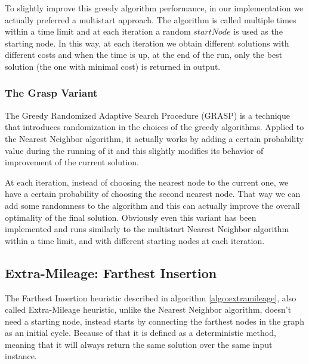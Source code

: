 To slightly improve this greedy algorithm performance, in our implementation we actually preferred a multistart approach. The algorithm is called multiple times within a time limit and at each iteration a random $startNode$ is used as the starting node. In this way, at each iteration we obtain different solutions with different costs and when the time is up, at the end of the run, only the best solution (the one with minimal cost) is returned in output.

\subsubsection{The Grasp Variant}
The Greedy Randomized Adaptive Search Procedure (GRASP) is a technique that introduces randomization in the choices of the greedy algorithms.
Applied to the Nearest Neighbor algorithm, it actually works by adding a certain probability value during the running of it and this slightly modifies its behavior of improvement of the current solution.

At each iteration, instead of choosing the nearest node to the current one, we have a certain probability of choosing the second nearest node. That way we can add some randomness to the algorithm and this can actually improve the overall optimality of the final solution.
Obviously even this variant has been implemented and runs similarly to the multistart Nearest Neighbor algorithm within a time limit, and with different starting nodes at each iteration.

\subsection{Extra-Mileage: Farthest Insertion}\label{extramileage}
The Farthest Insertion heuristic described in algorithm \ref{algo:extramileage}, also called Extra-Mileage heuristic, unlike the Nearest Neighbor algorithm, doesn’t need a starting node, instead starts by connecting the farthest nodes in the graph as an initial cycle. Because of that it is defined as a deterministic method, meaning that it will always return the same solution over the same input instance.

